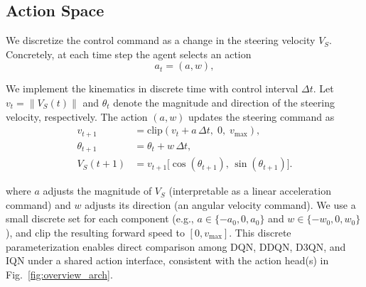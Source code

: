 \subsection{Action Space}
\label{sec:method_action}
We discretize the control command as a change in the steering velocity $V_S$. Concretely, at each time step the agent selects an action
\begin{equation}
a_t = (a,w),
\label{eq:action}
\end{equation}

We implement the kinematics in discrete time with control interval $\Delta t$. Let $v_t=\|V_S(t)\|$ and $\theta_t$ denote the magnitude and direction of the steering velocity, respectively. The action $(a,w)$ updates the steering command as
\begin{align}
v_{t+1} &= \mathrm{clip}\!\left(v_t + a\,\Delta t,\; 0,\; v_{\max}\right), \label{eq:vs_update_v}\\
\theta_{t+1} &= \theta_t + w\,\Delta t, \label{eq:vs_update_theta}\\
V_S(t+1) &= v_{t+1}\big[\cos(\theta_{t+1}),\,\sin(\theta_{t+1})\big]. \label{eq:vs_update_vec}
\end{align}

where $a$ adjusts the magnitude of $V_S$ (interpretable as a linear acceleration command) and $w$ adjusts its direction (an angular velocity command). We use a small discrete set for each component (e.g., $a \in \{-a_0,0,a_0\}$ and $w \in \{-w_0,0,w_0\}$), and clip the resulting forward speed to $[0,v_{\max}]$. This discrete parameterization enables direct comparison among DQN, DDQN, D3QN, and IQN under a shared action interface, consistent with the action head(s) in Fig.~\ref{fig:overview_arch}.

